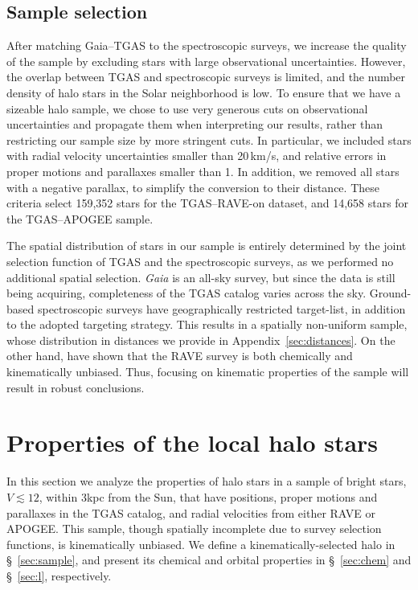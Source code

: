 \documentclass[apj, twocolappendix, numberedappendix, appendixfloats]{emulateapj}
\begin{document}
\subsection{Sample selection}
\label{sample}
After matching Gaia--TGAS to the spectroscopic surveys, we increase the quality of the sample by excluding stars with large observational uncertainties.
However, the overlap between TGAS and spectroscopic surveys is limited, and the number density of halo stars in the Solar neighborhood is low.
To ensure that we have a sizeable halo sample, we chose to use very generous cuts on observational uncertainties and propagate them when interpreting our results, rather than restricting our sample size by more stringent cuts.
In particular, we included stars with radial velocity uncertainties smaller than 20\,km/s, and relative errors in proper motions and parallaxes smaller than 1.
In addition, we removed all stars with a negative parallax, to simplify the conversion to their distance.
These criteria select 159,352 stars for the TGAS--RAVE-on dataset, and 14,658 stars for the TGAS--APOGEE sample.

The spatial distribution of stars in our sample is entirely determined by the joint selection function of TGAS and the spectroscopic surveys, as we performed no additional spatial selection.
\emph{Gaia} is an all-sky survey, but since the data is still being acquiring, completeness of the TGAS catalog varies across the sky.
Ground-based spectroscopic surveys have geographically restricted target-list, in addition to the adopted targeting strategy.
This results in a spatially non-uniform sample, whose distribution in distances we provide in Appendix~\ref{sec:distances}.
On the other hand, \citet{wojno2016} have shown that the RAVE survey is both chemically and kinematically unbiased.
Thus, focusing on kinematic properties of the sample will result in robust conclusions.

\section{Properties of the local halo stars}
\label{sec:halostars}
In this section we analyze the properties of halo stars in a sample of bright stars, $V\lesssim12$, within 3\;kpc from the Sun, that have positions, proper motions and parallaxes in the TGAS catalog, and radial velocities from either RAVE or APOGEE.
This sample, though spatially incomplete due to survey selection functions, is kinematically unbiased.
We define a kinematically-selected halo in \S~\ref{sec:sample}, and present its chemical and orbital properties in \S~\ref{sec:chem} and \S~\ref{sec:l}, respectively.
\end{document}
